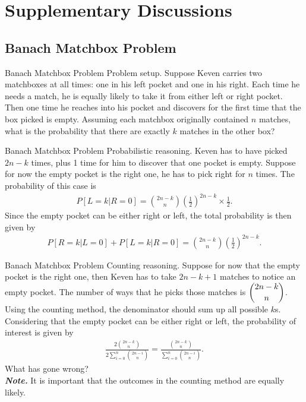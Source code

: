 \documentclass[hyperref={pdfpagelabels=false}]{beamer}
\newcommand{\highlightr}[1]{\textcolor[rgb]{1,0.3,0.2}{\emph{\textbf{#1}}}}
\newcommand{\structb}[1]{\textcolor[rgb]{0.2,0.2,0.7}{#1}}
\begin{document}
\section{Supplementary Discussions}
%
\subsection{Banach Matchbox Problem}
\begin{frame}{Banach Matchbox Problem}
    \justifying
    \structb{Problem setup.} Suppose Keven carries two matchboxes at all times: one in his left pocket and one in his right. Each time he needs a match, he is equally likely to take it from either left or right pocket. Then one time he reaches into his pocket and discovers for the first time that the box picked is empty. Assuming each matchbox originally contained $n$ matches, what is the probability that there are exactly $k$ matches in the other box?
\end{frame}
%
\begin{frame}{Banach Matchbox Problem}
    \justifying
    \structb{Probabilistic reasoning.} Keven has to have picked $2n-k$ times, plus 1 time for him to discover that one pocket is empty. Suppose for now the empty pocket is the right one, he has to pick right for $n$ times. The probability of this case is
    \begin{align*}
        P[L = k|R = 0] = \binom{2n-k}{n}\left(\frac{1}{2} \right)^{2n-k} \times \frac{1}{2}.
    \end{align*}
    Since the empty pocket can be either right or left, the total probability is then given by
    \begin{align*}
        P[R = k|L = 0] + P[L = k|R = 0] = \binom{2n-k}{n}\left(\frac{1}{2} \right)^{2n-k}.
    \end{align*}
\end{frame}
%
\begin{frame}{Banach Matchbox Problem}
    \justifying
    \structb{Counting reasoning.} Suppose for now that the empty pocket is the right one, then Keven has to take $2n-k+1$ matches to notice an empty pocket. The number of ways that he picks those matches is $\dbinom{2n-k}{n}$. Using the counting method, the denominator should sum up all possible $k$s. Considering that the empty pocket can be either right or left, the probability of interest is given by
    \begin{align*}
        \frac{2\binom{2n-k}{n}}{2\sum_{i=0}^n\binom{2n-i}{n}} = \frac{\binom{2n-k}{n}}{\sum_{i=0}^n \binom{2n-i}{n}}.
    \end{align*}
    What has gone wrong?
    \pause
    ~\\
    \highlightr{Note.} It is important that the outcomes in the counting method are equally likely.
\end{frame}
\end{document}
